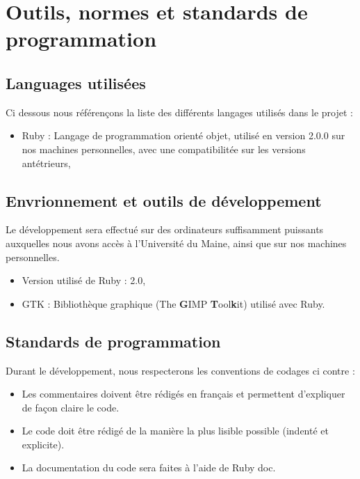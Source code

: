 \documentclass[11pt]{article}
\begin{document}
\newpage

\section{Outils, normes et standards de programmation}

\subsection{Languages utilisées}

Ci dessous nous référençons la liste des différents langages utilisés dans le projet : 

\begin{itemize}
	\item Ruby : Langage de programmation orienté objet, utilisé en version 2.0.0 sur nos machines personnelles, avec une compatibilitée sur les versions antétrieurs,
\end{itemize}

\subsection{Envrionnement et outils de développement}

Le développement sera effectué sur des ordinateurs suffisamment puissants auxquelles nous avons accès à l'Université du Maine, ainsi que sur nos machines personnelles.

\begin{itemize}
		\item Version utilisé de Ruby : 2.0,
		\item GTK : Bibliothèque graphique (The \textbf{G}IMP \textbf{T}ool\textbf{k}it) utilisé avec Ruby.
\end{itemize}

\subsection{Standards de programmation}

Durant le développement, nous respecterons les conventions de codages ci contre : 

\begin{itemize}
	\item Les commentaires doivent être rédigés en français et permettent d'expliquer de façon claire le code.
    \item Le code doit être rédigé de la manière la plus lisible possible (indenté et explicite).
	\item La documentation du code sera faites à l'aide de Ruby doc.
\end{itemize}
\end{document}
